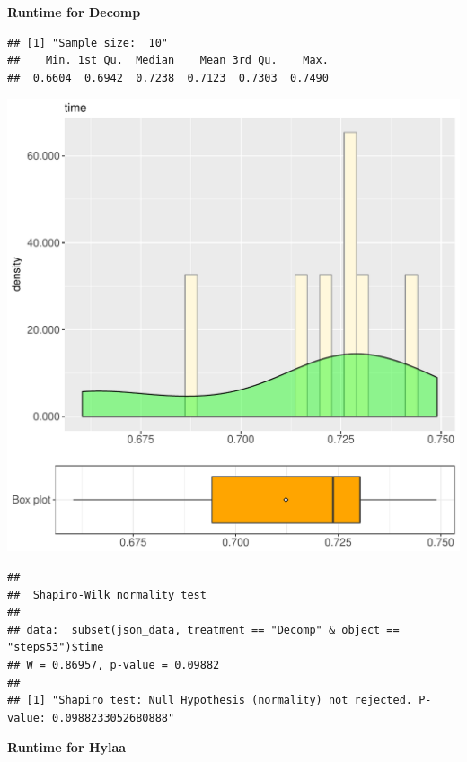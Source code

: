 \documentclass{article}\usepackage[]{graphicx}\usepackage[]{color}
\makeatletter
\def\maxwidth{ %
  \ifdim\Gin@nat@width>\linewidth
    \linewidth
  \else
    \Gin@nat@width
  \fi
}
\newenvironment{kframe}{%
 \def\at@end@of@kframe{}%
 \ifinner\ifhmode%
  \def\at@end@of@kframe{\end{minipage}}%
  \begin{minipage}{\columnwidth}%
 \fi\fi%
 \def\FrameCommand##1{\hskip\@totalleftmargin \hskip-\fboxsep
 \colorbox{shadecolor}{##1}\hskip-\fboxsep
     \hskip-\linewidth \hskip-\@totalleftmargin \hskip\columnwidth}%
 \MakeFramed {\advance\hsize-\width
   \@totalleftmargin\z@ \linewidth\hsize
   \@setminipage}}%
 {\par\unskip\endMakeFramed%
 \at@end@of@kframe}
\newenvironment{knitrout}{}{} %
\makeatother
\begin{document}
 \textbf{Runtime for Decomp}
\begin{knitrout}
\color{fgcolor}\begin{kframe}
\begin{verbatim}
## [1] "Sample size:  10"
##    Min. 1st Qu.  Median    Mean 3rd Qu.    Max. 
##  0.6604  0.6942  0.7238  0.7123  0.7303  0.7490
\end{verbatim}
\end{kframe}
\includegraphics[width=\maxwidth]{figure/RH2_Decomp_steps53-1} 
\begin{kframe}\begin{verbatim}
## 
## 	Shapiro-Wilk normality test
## 
## data:  subset(json_data, treatment == "Decomp" & object == "steps53")$time
## W = 0.86957, p-value = 0.09882
## 
## [1] "Shapiro test: Null Hypothesis (normality) not rejected. P-value: 0.0988233052680888"
\end{verbatim}
\end{kframe}
\end{knitrout}
 \textbf{Runtime for Hylaa}
\end{document}
